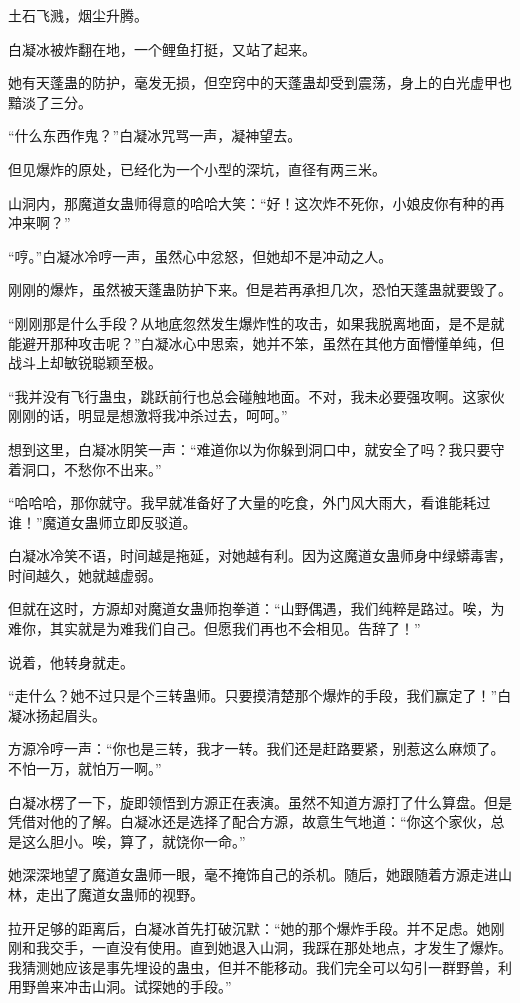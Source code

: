 
\begin{this_body}

土石飞溅，烟尘升腾。

白凝冰被炸翻在地，一个鲤鱼打挺，又站了起来。

她有天蓬蛊的防护，毫发无损，但空窍中的天蓬蛊却受到震荡，身上的白光虚甲也黯淡了三分。

“什么东西作鬼？”白凝冰咒骂一声，凝神望去。

但见爆炸的原处，已经化为一个小型的深坑，直径有两三米。

山洞内，那魔道女蛊师得意的哈哈大笑：“好！这次炸不死你，小娘皮你有种的再冲来啊？”

“哼。”白凝冰冷哼一声，虽然心中忿怒，但她却不是冲动之人。

刚刚的爆炸，虽然被天蓬蛊防护下来。但是若再承担几次，恐怕天蓬蛊就要毁了。

“刚刚那是什么手段？从地底忽然发生爆炸性的攻击，如果我脱离地面，是不是就能避开那种攻击呢？”白凝冰心中思索，她并不笨，虽然在其他方面懵懂单纯，但战斗上却敏锐聪颖至极。

“我并没有飞行蛊虫，跳跃前行也总会碰触地面。不对，我未必要强攻啊。这家伙刚刚的话，明显是想激将我冲杀过去，呵呵。”

想到这里，白凝冰阴笑一声：“难道你以为你躲到洞口中，就安全了吗？我只要守着洞口，不愁你不出来。”

“哈哈哈，那你就守。我早就准备好了大量的吃食，外门风大雨大，看谁能耗过谁！”魔道女蛊师立即反驳道。

白凝冰冷笑不语，时间越是拖延，对她越有利。因为这魔道女蛊师身中绿蟒毒害，时间越久，她就越虚弱。

但就在这时，方源却对魔道女蛊师抱拳道：“山野偶遇，我们纯粹是路过。唉，为难你，其实就是为难我们自己。但愿我们再也不会相见。告辞了！”

说着，他转身就走。

“走什么？她不过只是个三转蛊师。只要摸清楚那个爆炸的手段，我们赢定了！”白凝冰扬起眉头。

方源冷哼一声：“你也是三转，我才一转。我们还是赶路要紧，别惹这么麻烦了。不怕一万，就怕万一啊。”

白凝冰楞了一下，旋即领悟到方源正在表演。虽然不知道方源打了什么算盘。但是凭借对他的了解。白凝冰还是选择了配合方源，故意生气地道：“你这个家伙，总是这么胆小。唉，算了，就饶你一命。”

她深深地望了魔道女蛊师一眼，毫不掩饰自己的杀机。随后，她跟随着方源走进山林，走出了魔道女蛊师的视野。

拉开足够的距离后，白凝冰首先打破沉默：“她的那个爆炸手段。并不足虑。她刚刚和我交手，一直没有使用。直到她退入山洞，我踩在那处地点，才发生了爆炸。我猜测她应该是事先埋设的蛊虫，但并不能移动。我们完全可以勾引一群野兽，利用野兽来冲击山洞。试探她的手段。”


\end{this_body}
